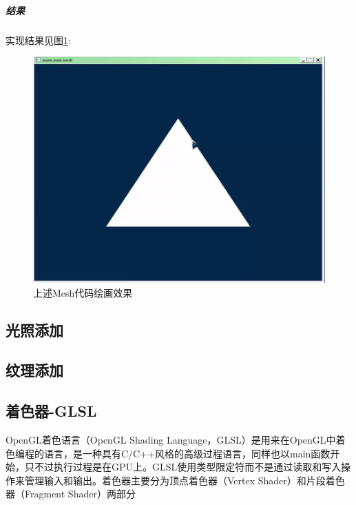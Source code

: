 \documentclass[UTF8,a4paper,8pt]{ctexart}
\begin{document}
		\subparagraph{结果}
			实现结果见图\ref{VAOResult}:
			\begin{figure}[h]
				\centering
				\includegraphics[scale = 0.5]{VBOMeshResult.png}
				\caption{上述Mesh代码绘画效果}
				\label{VAOResult}
			\end{figure}
	
	\subsection{光照添加}
	
	\subsection{纹理添加}
			
	\subsection{着色器-GLSL}
		OpenGL着色语言（OpenGL Shading Language，GLSL）是用来在OpenGL中着色编程的语言，是一种具有C/C++风格的高级过程语言，同样也以main函数开始，只不过执行过程是在GPU上。GLSL使用类型限定符而不是通过读取和写入操作来管理输入和输出。着色器主要分为顶点着色器（Vertex Shader）和片段着色器（Fragment Shader）两部分
\end{document}
